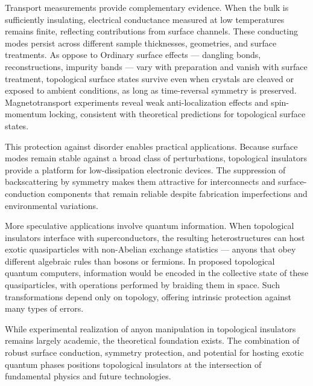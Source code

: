 Transport measurements provide complementary evidence. When the bulk is sufficiently insulating, electrical conductance measured at low temperatures remains finite, reflecting contributions from surface channels. These conducting modes persist across different sample thicknesses, geometries, and surface treatments. As oppose to Ordinary surface effects — dangling bonds, reconstructions, impurity bands — vary with preparation and vanish with surface treatment, topological surface states survive even when crystals are cleaved or exposed to ambient conditions, as long as time-reversal symmetry is preserved. Magnetotransport experiments reveal weak anti-localization effects and spin-momentum locking, consistent with theoretical predictions for topological surface states.

This protection against disorder enables practical applications. Because surface modes remain stable against a broad class of perturbations, topological insulators provide a platform for low-dissipation electronic devices. The suppression of backscattering by symmetry makes them attractive for interconnects and surface-conduction components that remain reliable despite fabrication imperfections and environmental variations.

More speculative applications involve quantum information. When topological insulators interface with superconductors, the resulting heterostructures can host exotic quasiparticles with non-Abelian exchange statistics — anyons that obey different algebraic rules than bosons or fermions. In proposed topological quantum computers, information would be encoded in the collective state of these quasiparticles, with operations performed by braiding them in space. Such transformations depend only on topology, offering intrinsic protection against many types of errors.

While experimental realization of anyon manipulation in topological insulators remains largely academic, the theoretical foundation exists. The combination of robust surface conduction, symmetry protection, and potential for hosting exotic quantum phases positions topological insulators at the intersection of fundamental physics and future technologies.
